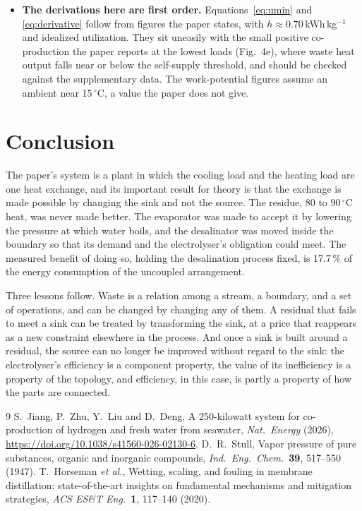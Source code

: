 \documentclass[11pt]{article}
\theoremstyle{definition}
\theoremstyle{remark}
\begin{document}
\begin{itemize}[leftmargin=1.6em,itemsep=2pt]
  \item \textbf{The derivations here are first order.} Equations~\eqref{eq:umin} and \eqref{eq:derivative} follow from figures the paper states, with $h\approx0.70$\,kWh\,kg$^{-1}$ and idealized utilization. They sit uneasily with the small positive co-production the paper reports at the lowest loads (Fig.~4e), where waste heat output falls near or below the self-supply threshold, and should be checked against the supplementary data. The work-potential figures assume an ambient near 15\,$^{\circ}$C, a value the paper does not give.
\end{itemize}

\section{Conclusion}

The paper's system is a plant in which the cooling load and the heating load are one heat exchange, and its important result for theory is that the exchange is made possible by changing the sink and not the source. The residue, 80 to 90\,$^{\circ}$C heat, was never made better. The evaporator was made to accept it by lowering the pressure at which water boils, and the desalinator was moved inside the boundary so that its demand and the electrolyser's obligation could meet. The measured benefit of doing so, holding the desalination process fixed, is 17.7\,\% of the energy consumption of the uncoupled arrangement.

Three lessons follow. Waste is a relation among a stream, a boundary, and a set of operations, and can be changed by changing any of them. A residual that fails to meet a sink can be treated by transforming the sink, at a price that reappears as a new constraint elsewhere in the process. And once a sink is built around a residual, the source can no longer be improved without regard to the sink: the electrolyser's efficiency is a component property, the value of its inefficiency is a property of the topology, and efficiency, in this case, is partly a property of how the parts are connected.

\begin{thebibliography}{9}
 S.~Jiang, P.~Zhu, Y.~Liu and D.~Deng, A 250-kilowatt system for co-production of hydrogen and fresh water from seawater, \emph{Nat.\ Energy} (2026), \url{https://doi.org/10.1038/s41560-026-02130-6}.
 D.~R.~Stull, Vapor pressure of pure substances, organic and inorganic compounds, \emph{Ind.\ Eng.\ Chem.}\ \textbf{39}, 517--550 (1947).
 T.~Horseman \emph{et al.}, Wetting, scaling, and fouling in membrane distillation: state-of-the-art insights on fundamental mechanisms and mitigation strategies, \emph{ACS ES\&T Eng.}\ \textbf{1}, 117--140 (2020).
\end{thebibliography}
\end{document}
